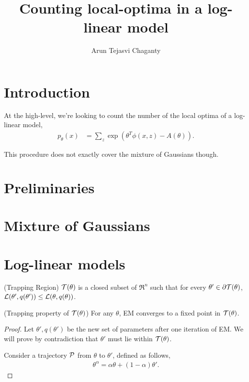 \documentclass[tablecaption=bottom]{jmlr}
\title{Counting local-optima in a log-linear model}
\author{Arun Tejasvi Chaganty \Email{chaganty@cs.stanford.edu}}
\begin{document}
\maketitle

\section{Introduction}

At the high-level, we're looking to count the number of the local optima
of a log-linear model,
\begin{align}
p_{\theta}(x) &= \sum_z \exp(\theta^T \phi(x,z) - A(\theta)).
\end{align}

This procedure does not exactly cover the mixture of Gaussians though.

\section{Preliminaries}

\section{Mixture of Gaussians}

\section{Log-linear models}


\begin{definition}(Trapping Region)
  $\mathcal{T}(\theta)$ is a closed subset of $\Re^n$ such that for every
  $\theta' \in \partial \mathcal{T}(\theta)$, $\mathcal{L}(\theta', q(\theta')) \le \mathcal{L}(
  \theta, q(\theta) )$.
\end{definition}

\begin{lemma}(Trapping property of $\mathcal{T}(\theta)$)
  For any $\theta$, EM converges to a fixed point in $\mathcal{T}(\theta)$.
\end{lemma}
\begin{proof}
  Let $\theta', q(\theta')$ be the new set of parameters after one
  iteration of EM. We will prove by contradiction that $\theta'$ must
  lie within $\mathcal{T}(\theta)$. 
  
  Consider a trajectory $\mathcal{P}$ from $\theta$ to $\theta'$, defined as follows,
  \begin{align}
    \theta^\alpha = \alpha \theta + (1-\alpha) \theta'.
  \end{align}


\end{proof}
\end{document}
